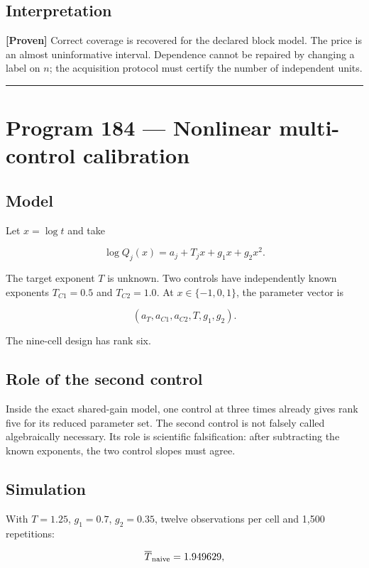 \documentclass[11pt,a4paper,openany]{report}
\newcommand{\statusProven}{\textcolor{fingreen}{[Proven]}}
\begin{document}
\section{Interpretation}

\textbf{\statusProven{}} Correct coverage is recovered for the declared block model. The price is an almost uninformative interval. Dependence cannot be repaired by changing a label on \(n\); the acquisition protocol must certify the number of independent units.

\par\medskip\hrule\medskip

\chapter{Program 184 --- Nonlinear multi-control calibration}

\section{Model}

Let \(x=\log t\) and take

\[
\log Q_j(x)
=
a_j+T_jx+g_1x+g_2x^2.
\]

The target exponent \(T\) is unknown. Two controls have independently known exponents \(T_{C1}=0.5\) and \(T_{C2}=1.0\). At \(x\in\{-1,0,1\}\), the parameter vector is

\[
(a_T,a_{C1},a_{C2},T,g_1,g_2).
\]

The nine-cell design has rank six.

\section{Role of the second control}

Inside the exact shared-gain model, one control at three times already gives rank five for its reduced parameter set. The second control is not falsely called algebraically necessary. Its role is scientific falsification: after subtracting the known exponents, the two control slopes must agree.

\section{Simulation}

With \(T=1.25\), \(g_1=0.7\), \(g_2=0.35\), twelve observations per cell and 1,500 repetitions:

\[
\overline T_{\rm naive}=1.949629,
\]
\end{document}
